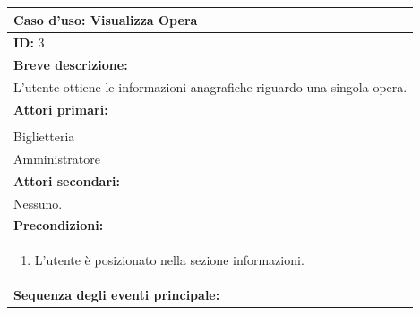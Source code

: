 \documentclass{article}
\begin{document}
                \begin{table}[H]
                    \begin{tabular}{|p{\linewidth}|}
                        \hline
                        \cellcolor{gray!100}
                        \color{white}
                        \centerline{\textbf{Caso d'uso:} Visualizza Opera} \\
                        \hline
                        \textbf{ID:} 3 \\
                        \hline
                        \cellcolor{gray!20}
                        \textbf{Breve descrizione:} \\
                        \cellcolor{gray!20}
                        L'utente ottiene le informazioni anagrafiche riguardo una singola opera. \\
                        \hline
                        \textbf{Attori primari:} \\
                        \begin{minipage}{\linewidth}
                            Cliente \\
                            Biglietteria \\
                            Amministratore
                        \end{minipage}
                        \vspace{0pt} \\ %
                        \hline
                        \textbf{Attori secondari:} \\
                        Nessuno. \\
                        \hline
                        \cellcolor{gray!20}
                        \textbf{Precondizioni:} \\
                        \cellcolor{gray!20}
                        \begin{minipage}{\linewidth}
                            \begin{enumerate}
                                \item L'utente è posizionato nella sezione informazioni.
                            \end{enumerate}
                        \end{minipage} \\
                        \hline
                        \textbf{Sequenza degli eventi principale:}

\end{tabular}
\end{table}
\end{document}
